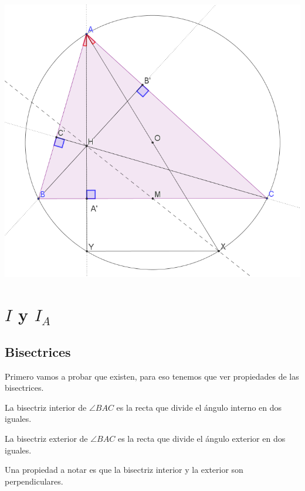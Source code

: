 \documentclass[11pt]{scrartcl}
\begin{document}
    \begin{center}
        \includegraphics[scale=0.8]{PNAC10.png}
    \end{center}




\section{$I$ y $I_A$}


\subsection{Bisectrices}

Primero vamos a probar que existen, para eso tenemos que ver propiedades de las bisectrices. \\

\begin{definition}
    La bisectriz interior de $\angle BAC$ es la recta  que divide el \'angulo interno en dos iguales.
\end{definition}
\begin{definition}
    La bisectriz exterior de $\angle BAC$ es la recta  que divide el \'angulo exterior en dos iguales.
\end{definition}

Una propiedad a notar es que la bisectriz interior y la exterior son perpendiculares. \\
\end{document}
